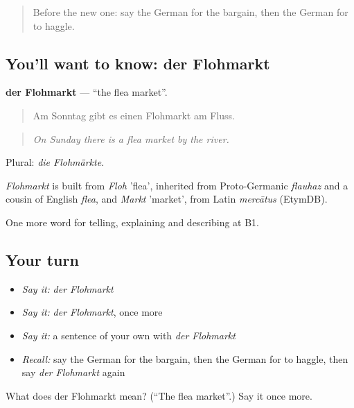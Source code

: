 \label{lesson:GE-C451-flohmarkt}



\begin{quote}
Before the new one: say the German for the bargain, then the German for to haggle.
\end{quote}

\subsection*{You'll want to know: der Flohmarkt}
\textbf{der Flohmarkt} — \textquotedblleft{}the flea market\textquotedblright{}.

\begin{quote}
Am Sonntag gibt es einen Flohmarkt am Fluss.
\end{quote}

\begin{quote}
\emph{On Sunday there is a flea market by the river.}
\end{quote}

Plural: \emph{die Flohmärkte}.

\begin{cousinweb}
\emph{Flohmarkt} is built from \emph{Floh} 'flea', inherited from Proto-Germanic \emph{flauhaz} and a cousin of English \emph{flea}, and \emph{Markt} 'market', from Latin \emph{mercātus} (EtymDB).
\end{cousinweb}

\begin{grammarlens}[title={What you've built}]
One more word for telling, explaining and describing at B1.
\end{grammarlens}

\subsection*{Your turn}
\begin{itemize}
\raggedright
  \item \emph{Say it:} \emph{der Flohmarkt}
  \item \emph{Say it:} \emph{der Flohmarkt}, once more
  \item \emph{Say it:} a sentence of your own with \emph{der Flohmarkt}
  \item \emph{Recall:} say the German for the bargain, then the German for to haggle, then say \emph{der Flohmarkt} again
\end{itemize}

\begin{tcolorbox}[breakable,colback=teal!4,colframe=teal!35!black,title={Before you move on}]
What does der Flohmarkt mean? (\textquotedblleft{}The flea market\textquotedblright{}.) Say it once more.
\end{tcolorbox}
